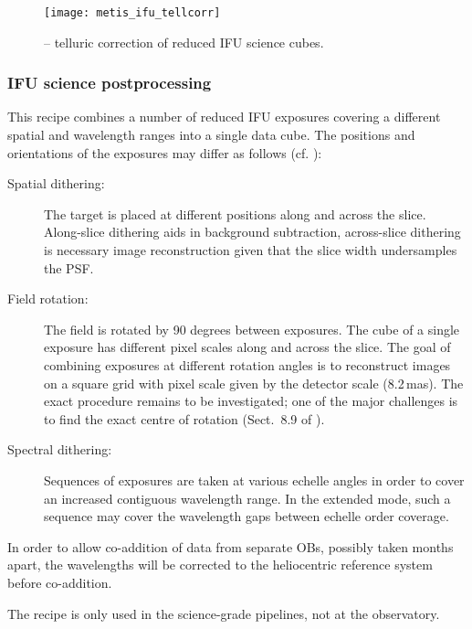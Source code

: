 \begin{figure}[hb]
  \centering
  \texttt{[image: metis\_ifu\_tellcorr]}
  \caption[Recipe: ]{
    -- telluric correction of reduced IFU science cubes.}
  \label{fig:metis_ifu_tellcorr}
\end{figure}


\clearpage
\subsubsection{IFU science postprocessing}
\label{sssec:ifu_sci_postprocess}
\label{rec:metis_ifu_sci_postprocess}

This recipe combines a number of reduced IFU exposures covering a
different spatial and wavelength ranges into a single data cube. The
positions and orientations of the exposures may differ as follows (cf. \cite{METIS-operational_concept}): %
\begin{description}
\item[Spatial dithering:] The target is placed at different positions
  along and across the slice. Along-slice dithering aids in background
  subtraction, across-slice dithering is necessary image
  reconstruction given that the slice width undersamples the PSF.
\item[Field rotation:] The field is rotated by 90 degrees between
  exposures. The cube of a single exposure has different pixel scales
  along and across the slice. The goal of combining exposures at
  different rotation angles is to reconstruct images on a square grid
  with pixel scale given by the detector scale (8.2\,mas). The exact
  procedure remains to be investigated; one of the major challenges is
  to find the exact centre of rotation
  (Sect.~8.9 of \cite{DRLS}).
\item[Spectral dithering:] Sequences of exposures are taken at various
  echelle angles in order to cover an increased contiguous wavelength
  range. In the extended mode, such a sequence may cover the
  wavelength gaps between echelle order coverage.
\end{description}

In order to allow co-addition of data from separate OBs, possibly taken
months apart, the wavelengths will be corrected to the heliocentric
reference system before co-addition.

The recipe is only used in the science-grade pipelines, not at the
observatory.

